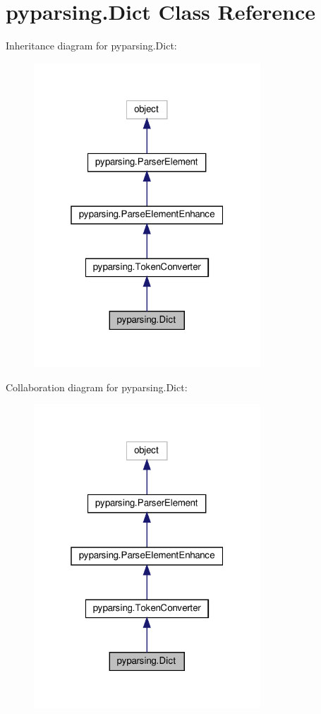 \hypertarget{classpyparsing_1_1Dict}{}\section{pyparsing.\+Dict Class Reference}
\label{classpyparsing_1_1Dict}


Inheritance diagram for pyparsing.\+Dict\+:
\nopagebreak
\begin{figure}[H]
\begin{center}
\leavevmode
\includegraphics[width=241pt]{classpyparsing_1_1Dict__inherit__graph}
\end{center}
\end{figure}


Collaboration diagram for pyparsing.\+Dict\+:
\nopagebreak
\begin{figure}[H]
\begin{center}
\leavevmode
\includegraphics[width=241pt]{classpyparsing_1_1Dict__coll__graph}
\end{center}
\end{figure}
